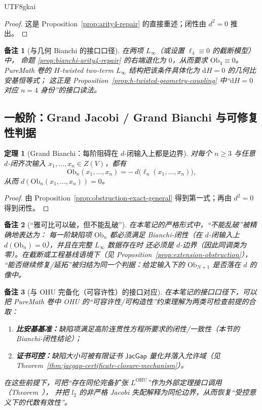 \documentclass[12pt]{article}
\newtheorem{theorem}{定理}[section]
\newtheorem{remark}{备注}[section]
\newcommand{\Layer}{\ensuremath{\ell}}
\newcommand{\Ob}{\mathrm{Ob}}
\newcommand{\JacGap}{\ensuremath{\mathsf{JacGap}}}
\newcommand{\code}[1]{\path{#1}}
\begin{document}
\begin{CJK*}{UTF8}{gkai}
\begin{proof}
这是 Proposition~\ref{prop:arity4-repair} 的直接重述；闭性由 $d^2=0$ 推出。
\end{proof}

\begin{remark}[与几何 Bianchi 的接口口径]
在两项 $L_\infty$（或设置 $\Layer_4\equiv 0$ 的截断模型）中，
命题 \ref{prop:bianchi-arity4-repair} 的右端退化为 $0$，从而要求 $\Ob_4\equiv 0$。
PureMath 卷的 $H$-twisted two-term $L_\infty$ 结构把该条件具体化为 $\mathrm{d}H=0$ 的几何比安基恒等式；
这正是 Proposition~\ref{prop:h-twisted-geometry-coupling} 中“$\mathrm{d}H=0$ 对应 $n=4$ 身份”的接口读法。
\end{remark}

\subsection{一般阶：Grand Jacobi / Grand Bianchi 与可修复性判据}

\begin{theorem}[Grand Bianchi：每阶阻碍在 $d$-闭输入上都是边界]
\label{thm:grand-bianchi-obstruction}
对每个 $n\ge 3$ 与任意 $d$-闭齐次输入 $x_1,\dots,x_n\in Z(V)$，都有
\[
  \Ob_n(x_1,\dots,x_n)=-\,d\bigl(\Layer_n(x_1,\dots,x_n)\bigr),
\]
从而 $d(\Ob_n(x_1,\dots,x_n))=0$。
\end{theorem}

\begin{proof}
由 Proposition~\ref{prop:obstruction-exact-general} 得到第一式；再由 $d^2=0$ 得到闭性。
\end{proof}

\begin{remark}[“雅可比可以破，但不能乱破”]
在本笔记的严格形式中，“不能乱破”被精确地表达为：
每一阶缺陷项 $\Ob_n$ 都必须满足 Bianchi-闭性（在 $d$-闭输入上 $d(\Ob_n)=0$），并且在完整 $L_\infty$ 数据存在时
还必须是 $d$-边界（因此同调类为零）。在截断或工程基线语境下（见 Proposition~\ref{prop:extension-obstruction}），
“能否继续修复/延拓”被归结为同一个判据：给定输入下的 $\Ob_{N+1}$ 是否落在 $d$ 的像中。
\end{remark}

\begin{remark}[与 OHU 完备化（可容许性）的接口对应]
在本笔记的接口口径下，可以把 PureMath 卷中 OHU 的“可容许性/可构造性”约束理解为两类可检查前提的合取：
\begin{enumerate}
  \item \textbf{比安基基准：}缺陷项满足高阶连贯性方程所要求的闭性/一致性（本节的 Bianchi-闭性结论）；
  \item \textbf{证书可控：}缺陷大小可被有限证书 $\JacGap$ 量化并落入允许域（见 Theorem~\ref{thm:jacgap-certificate-closure-mechanism}）。
\end{enumerate}
在这些前提下，可把“存在同伦完备扩张 $L^{\mathrm{OHU}}$”作为外部定理接口调用（Theorem~\code{thm:GZ-OHU}），
并把 $l_2$ 的非严格 Jacobi 失配解释为同伦边界，从而恢复“受控意义下的代数有效性”。
\end{remark}


\end{CJK*}
\end{document}
